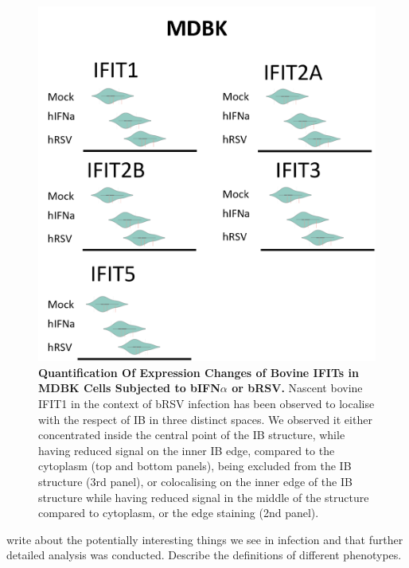 \begin{figure}
    \centering
    \includegraphics[width=1\linewidth]{09. Chapter 4/Figs/01. Localisation introduction/09. mdbk plots.png}
    \caption[Quantification Of Expression Changes of Bovine IFITs in MDBK Cells Subjected to bIFN\(\alpha\) or bRSV.]{\textbf{Quantification Of Expression Changes of Bovine IFITs in MDBK Cells Subjected to bIFN\(\alpha\) or bRSV.} Nascent bovine IFIT1 in the context of bRSV infection has been observed to localise with the respect of IB in three distinct spaces. We observed it either concentrated inside the central point of the IB structure, while having reduced signal on the inner IB edge, compared to the cytoplasm (top and bottom panels), being excluded from the IB structure (3rd panel), or colocalising on the inner edge of the IB structure while having reduced signal in the middle of the structure compared to cytoplasm, or the edge staining (2nd panel).}
    \label{fig:Quantification Of Expression Changes of Bovine IFITs in MDBK Cells Subjected to bIFN\(\alpha\) or bRSV}
\end{figure}

write about the potentially interesting things we see in infection and that further detailed analysis was conducted. Describe the definitions of different phenotypes. 